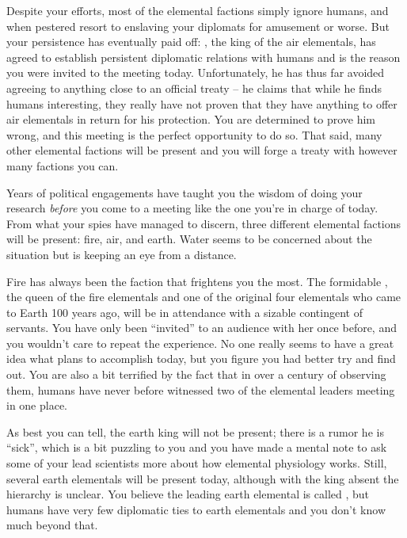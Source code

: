 \documentclass[char]{elementals}
\begin{document}
Despite your efforts, most of the elemental factions simply ignore humans, and when pestered resort to enslaving your diplomats for amusement or worse. But your persistence has eventually paid off: \cKing{\intro}, the king of the air elementals, has agreed to establish persistent diplomatic relations with humans and is the reason you were invited to the meeting today. Unfortunately, he has thus far avoided agreeing to anything close to an official treaty -- he claims that while he finds humans interesting, they really have not proven that they have anything to offer air elementals in return for his protection. You are determined to prove him wrong, and this meeting is the perfect opportunity to do so. That said, many other elemental factions will be present and you will forge a treaty with however many factions you can.

Years of political engagements have taught you the wisdom of doing your research \emph{before} you come to a meeting like the one you're in charge of today. From what your spies have managed to discern, three different elemental factions will be present: fire, air, and earth. Water seems to be concerned about the situation but is keeping an eye from a distance.


Fire has always been the faction that frightens you the most. The formidable \cQueen{\intro}, the queen of the fire elementals and one of the original four elementals who came to Earth 100 years ago, will be in attendance with a sizable contingent of servants. You have only been ``invited'' to an audience with her once before, and you wouldn't care to repeat the experience. No one really seems to have a great idea what \cQueen{} plans to accomplish today, but you figure you had better try and find out. You are also a bit terrified by the fact that in over a century of observing them, humans have never before witnessed two of the elemental leaders meeting in one place.

As best you can tell, the earth king will not be present; there is a rumor he is ``sick'', which is a bit puzzling to you and you have made a mental note to ask some of your lead scientists more about how elemental physiology works. Still, several earth elementals will be present today, although with the king absent the hierarchy is unclear. You believe the leading earth elemental is called \cLoyal{\intro}, but humans have very few diplomatic ties to earth elementals and you don't know much beyond that.
\end{document}
